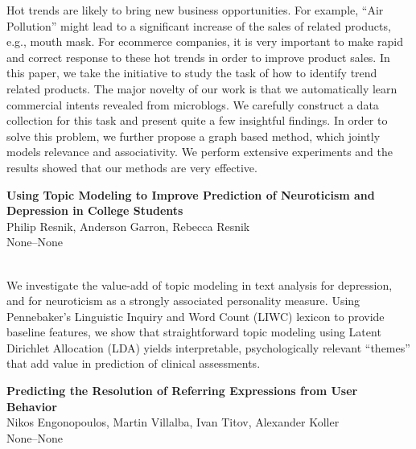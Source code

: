 \documentclass[twoside,makeidx]{book}
\renewcommand{\normalsize}{\fontsize{8}{9}\selectfont}
\renewcommand{\small}{\fontsize{7}{8}\selectfont}
\begin{document}
\nopagebreak%
\noindent%
{\small Hot trends are likely to bring new business opportunities. For example, ``Air Pollution'' might lead to a significant increase of the sales of related products, e.g., mouth mask. For ecommerce companies, it is very important to make rapid and correct response to these hot trends in order to improve product sales. In this paper, we take the initiative to study the task of how to identify trend related products. The major novelty of our work is that we automatically learn commercial intents revealed from microblogs. We carefully construct a data collection for this task and present quite a few insightful findings. In order to solve this problem, we further propose a graph based method, which jointly models relevance and associativity. We perform extensive experiments and the results showed that our methods are very effective.}
\par\vspace{2em}\noindent%
\begin{minipage}{\linewidth}%
\begin{center}
\textbf{\normalsize Using Topic Modeling to Improve Prediction of Neuroticism and Depression in College Students}\\
\normalsize  Philip Resnik,  Anderson Garron,  Rebecca Resnik\\
{\small None--None}\\
\end{center}
\end{minipage}\\[0.5em]
\nopagebreak%
\noindent%
{\small We investigate the value-add of topic modeling in text analysis for depression, and for neuroticism as a strongly associated personality measure.  Using Pennebaker's Linguistic Inquiry and Word Count (LIWC) lexicon to provide baseline features, we show that straightforward topic modeling using Latent Dirichlet Allocation (LDA) yields interpretable, psychologically relevant  ``themes'' that add value in prediction of clinical assessments.}
\par\vspace{2em}\noindent%
\begin{minipage}{\linewidth}%
\begin{center}
\textbf{\normalsize Predicting the Resolution of Referring Expressions from User Behavior}\\
\normalsize  Nikos Engonopoulos,  Martin Villalba,  Ivan Titov,  Alexander Koller\\
{\small None--None}\\
\end{center}
\end{minipage}\\[0.5em]
\end{document}
